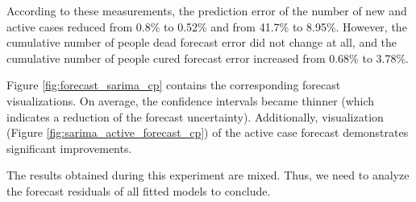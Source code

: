 According to these measurements, the prediction error of the number of new and active cases reduced from 0.8\% to 0.52\% and from 41.7\% to 8.95\%. However, the cumulative number of people dead forecast error did not change at all, and the cumulative number of people cured forecast error increased from 0.68\% to 3.78\%. 

Figure \ref{fig:forecast_sarima_cp} contains the corresponding forecast visualizations. On average, the confidence intervals became thinner (which indicates a reduction of the forecast uncertainty). Additionally, visualization (Figure \ref{fig:sarima_active_forecast_cp}) of the active case forecast demonstrates significant improvements. 

The results obtained during this experiment are mixed. Thus, we need to analyze the forecast residuals of all fitted models to conclude.


